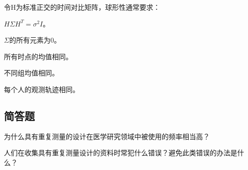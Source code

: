 \par\addvspace{6pt}\noindent\begin{minipage}{\linewidth}


令H为标准正交的时间对比矩阵，球形性通常要求：


\begin{choices}

\item \(H\Sigma H^T=\sigma^2I\)。

\item \(\Sigma\)的所有元素为0。

\item 所有时点的均值相同。

\item 不同组均值相同。

\item 每个人的观测轨迹相同。

\end{choices}

\end{minipage}\par\vspace{4pt}

\subsection{简答题}

\par\addvspace{6pt}\noindent\begin{minipage}{\linewidth}


为什么具有重复测量的设计在医学研究领域中被使用的频率相当高？



\end{minipage}\par\vspace{4pt}

\par\addvspace{6pt}\noindent\begin{minipage}{\linewidth}


人们在收集具有重复测量设计的资料时常犯什么错误？避免此类错误的办法是什么？



\end{minipage}\par\vspace{4pt}

